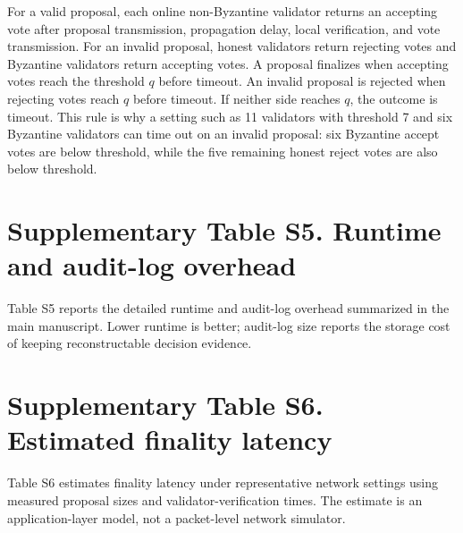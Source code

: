\documentclass[12pt]{article}
\begin{document}
For a valid proposal, each online non-Byzantine validator returns an accepting vote after proposal transmission, propagation delay, local verification, and vote transmission. For an invalid proposal, honest validators return rejecting votes and Byzantine validators return accepting votes. A proposal finalizes when accepting votes reach the threshold $q$ before timeout. An invalid proposal is rejected when rejecting votes reach $q$ before timeout. If neither side reaches $q$, the outcome is timeout. This rule is why a setting such as 11 validators with threshold 7 and six Byzantine validators can time out on an invalid proposal: six Byzantine accept votes are below threshold, while the five remaining honest reject votes are also below threshold.

\clearpage
\section*{Supplementary Table S5. Runtime and audit-log overhead}

Table S5 reports the detailed runtime and audit-log overhead summarized in the main manuscript. Lower runtime is better; audit-log size reports the storage cost of keeping reconstructable decision evidence.

\begin{table}[h]
\centering
\caption*{S5. Runtime and audit-log overhead summary for latest formal runs.}
\end{table}

\section*{Supplementary Table S6. Estimated finality latency}

Table S6 estimates finality latency under representative network settings using measured proposal sizes and validator-verification times. The estimate is an application-layer model, not a packet-level network simulator.
\end{document}
